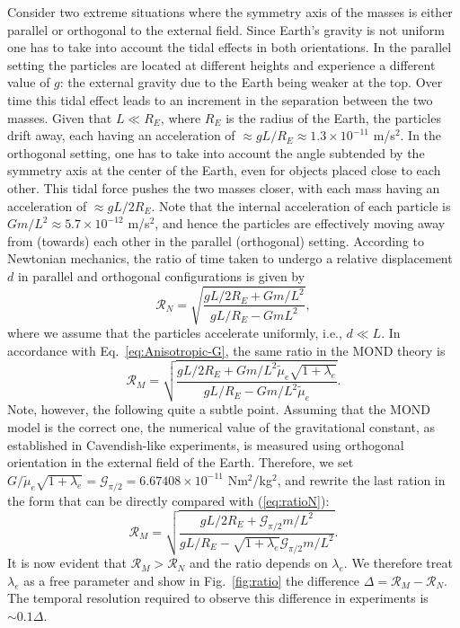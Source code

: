 \documentclass[aps,prl,reprint,superscriptaddress,nofootinbib,floatfix]{revtex4-2}
\begin{document}
Consider two extreme situations where the symmetry axis of the masses is either parallel or orthogonal to the external field.
Since Earth's gravity is not uniform one has to take into account the tidal effects in both orientations.
In the parallel setting the particles are located at different heights and experience a different value of $g$: the external gravity due to the Earth being weaker at the top.
Over time this tidal effect leads to an increment in the separation between the two masses.
Given that $L \ll R_E$, where $R_E$ is the radius of the Earth, the particles drift away, each having an acceleration of $\approx gL/R_E \approx 1.3 \times 10^{-11}$ m/s$^2$.
In the orthogonal setting, one has to take into account the angle subtended by the symmetry axis at the center of the Earth, even for objects placed close to each other. 
This tidal force pushes the two masses closer, with each mass having an acceleration of $\approx gL/2R_E$.
Note that the internal acceleration of each particle is $G m / L^2 \approx 5.7 \times 10^{-12}$ m/s$^2$, and hence the particles are effectively moving away from (towards) each other in the parallel (orthogonal) setting. 
According to Newtonian mechanics, the ratio of time taken to undergo a relative displacement $d$ 
in parallel and orthogonal configurations is given by
\begin{equation}
    \mathcal{R}_N = \sqrt{ \frac{ gL/2R_E + G m/L^2 } { gL/R_E - G mL^2  } },
    \label{eq:ratioN}
\end{equation}
where we assume that the particles accelerate uniformly, i.e., $d \ll L$.
In accordance with Eq.~\eqref{eq:Anisotropic-G}, the same ratio in the MOND theory is
\begin{equation}
    \mathcal{R}_M = \sqrt{ \frac{ gL/2R_E + G m/L^2\tilde\mu_e\sqrt{1+\lambda_e} } { gL/R_E - G m/L^2\tilde\mu_e } }.
\end{equation}
Note, however, the following quite a subtle point. Assuming that the MOND model is the correct one, the numerical value of the gravitational constant, as established in Cavendish-like experiments, is measured using orthogonal orientation in the external field of the Earth. Therefore, we set 
$G/\tilde \mu_e \sqrt{1+\lambda_e} = \mathcal{G}_{\pi/2} = 6.67408 \times 10^{-11}$ Nm$^2$/kg$^2$, and rewrite the last ration in the form that can be directly compared with (\ref{eq:ratioN}):
\begin{equation}
    \mathcal{R}_M = \sqrt{ \frac{ gL/2R_E + \mathcal{G}_{\pi/2} m/L^2 } { gL/R_E - \sqrt{1+\lambda_e} \mathcal{G}_{\pi/2} m/L^2 } }.
    \label{eq:ratioM}
\end{equation}
It is now evident that $\mathcal{R}_M > \mathcal{R}_N$ and the ratio depends on $\lambda_e$. We therefore treat $\lambda_e$ as a free parameter and show in Fig.~\ref{fig:ratio} the difference 
$\Delta = \mathcal{R}_M - \mathcal{R}_N$.
The temporal resolution required to observe this difference in experiments is $\sim 0.1\Delta$.
\end{document}
